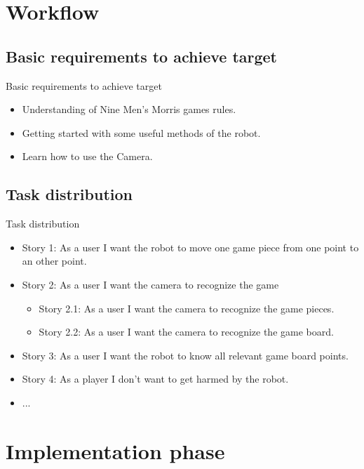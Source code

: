 \documentclass{beamer}
\begin{document}
\section{Workflow}
\subsection{Basic requirements to achieve target}
\begin{frame}{Basic requirements to achieve target}
\begin{itemize}
\item Understanding of Nine Men's Morris games rules.
\item Getting started with some useful methods of the robot.
\item Learn how to use the Camera. 
\end{itemize}
\end{frame}


\subsection{Task distribution}
\begin{frame}{Task distribution}
\begin{itemize}
\item Story 1: As a user I want the robot to move one game piece from one point to an other point.
\item Story 2: As a user I want the camera to recognize the game
\begin{itemize}
\item Story 2.1: As a user I want the camera to recognize the game pieces.
\item Story 2.2: As a user I want the camera to recognize the game board.
\end{itemize}
\item Story 3: As a user I want the robot to know all relevant game board points.
\item Story 4: As a player I don't want to get harmed by the robot.
\item ...
\end{itemize}
\end{frame}



\section{Implementation phase}
\end{document}
